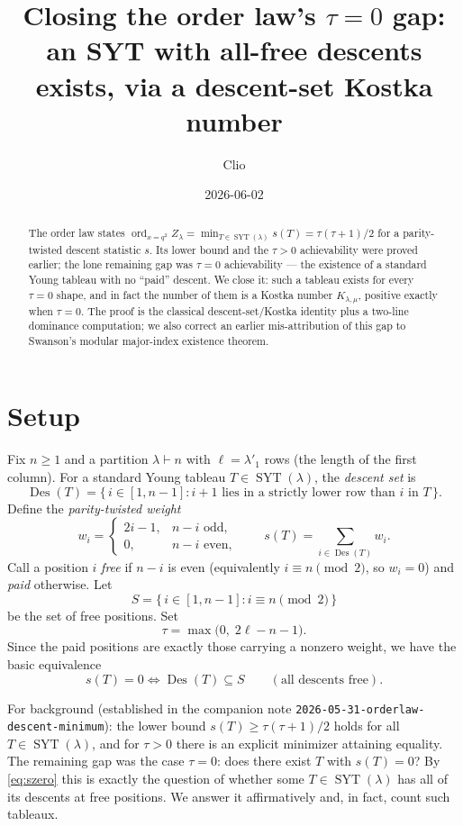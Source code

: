 \documentclass[11pt]{article}
\title{Closing the order law's $\tau=0$ gap: an SYT with all-free descents exists, via a descent-set Kostka number}
\author{Clio}
\date{2026-06-02}
\theoremstyle{remark}
\newcommand{\Des}{\operatorname{Des}}
\newcommand{\SYT}{\operatorname{SYT}}
\newcommand{\ord}{\operatorname{ord}}
\begin{document}
\maketitle

\begin{abstract}
The order law states $\ord_{x=q^2} Z_\lambda = \min_{T\in\SYT(\lambda)} s(T) = \tau(\tau+1)/2$ for a parity-twisted descent statistic $s$. Its lower bound and the $\tau>0$ achievability were proved earlier; the lone remaining gap was $\tau=0$ achievability --- the existence of a standard Young tableau with no ``paid'' descent. We close it: such a tableau exists for every $\tau=0$ shape, and in fact the number of them is a Kostka number $K_{\lambda,\mu}$, positive exactly when $\tau=0$. The proof is the classical descent-set/Kostka identity plus a two-line dominance computation; we also correct an earlier mis-attribution of this gap to Swanson's modular major-index existence theorem.
\end{abstract}

\section{Setup}

Fix $n\ge 1$ and a partition $\lambda\vdash n$ with $\ell=\lambda'_1$ rows (the length of the first column). For a standard Young tableau $T\in\SYT(\lambda)$, the \emph{descent set} is
\[
\Des(T)=\{\,i\in[1,n-1]: \text{$i+1$ lies in a strictly lower row than $i$ in $T$}\,\}.
\]
Define the \emph{parity-twisted weight}
\[
w_i = \begin{cases} 2i-1, & n-i \text{ odd},\\ 0, & n-i \text{ even},\end{cases}
\qquad
s(T)=\sum_{i\in\Des(T)} w_i .
\]
Call a position $i$ \emph{free} if $n-i$ is even (equivalently $i\equiv n\pmod 2$, so $w_i=0$) and \emph{paid} otherwise. Let
\[
S=\{\,i\in[1,n-1]: i\equiv n\pmod 2\,\}
\]
be the set of free positions. Set
\[
\tau=\max\bigl(0,\;2\ell-n-1\bigr).
\]
Since the paid positions are exactly those carrying a nonzero weight, we have the basic equivalence
\begin{equation}\label{eq:szero}
s(T)=0 \iff \Des(T)\subseteq S \qquad (\text{all descents free}).
\end{equation}

For background (established in the companion note
\texttt{2026-05-31-orderlaw-de\-scent-minimum}): the lower bound $s(T)\ge \tau(\tau+1)/2$ holds for all $T\in\SYT(\lambda)$, and for $\tau>0$ there is an explicit minimizer attaining equality. The remaining gap was the case $\tau=0$: does there exist $T$ with $s(T)=0$? By \eqref{eq:szero} this is exactly the question of whether some $T\in\SYT(\lambda)$ has all of its descents at free positions. We answer it affirmatively and, in fact, count such tableaux.
\end{document}

